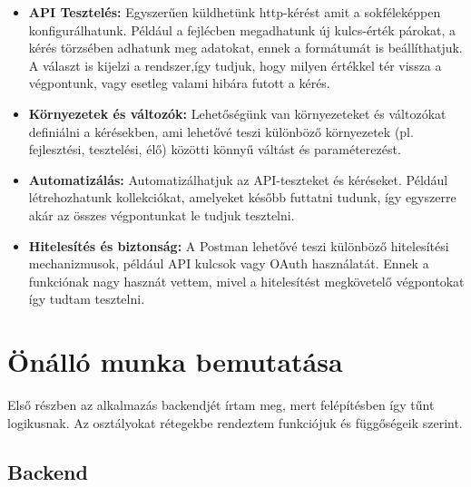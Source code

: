 \documentclass[a4paper,twoside]{article}
\begin{document}
\begin{itemize}
	\item \textbf{API Tesztelés:} Egyszerűen küldhetünk http-kérést amit a sokféleképpen konfigurálhatunk. Például a fejlécben megadhatunk új kulcs-érték párokat, a kérés törzsében adhatunk meg adatokat, ennek a formátumát is beállíthatjuk. A választ is kijelzi a rendszer,így tudjuk, hogy milyen értékkel tér vissza a végpontunk, vagy esetleg valami hibára futott a kérés. 
	\item \textbf{Környezetek és változók:} Lehetőségünk van környezeteket és változókat definiálni a kérésekben, ami lehetővé teszi különböző környezetek (pl. fejlesztési, tesztelési, élő) közötti könnyű váltást és paraméterezést.
	\item \textbf{Automatizálás:} Automatizálhatjuk az API-teszteket és kéréseket. Például létrehozhatunk kollekciókat, amelyeket később futtatni tudunk, így egyszerre akár az összes végpontunkat le tudjuk tesztelni. 
	\item \textbf{Hitelesítés és biztonság:} A Postman lehetővé teszi különböző hitelesítési mechanizmusok, például API kulcsok vagy OAuth használatát. Ennek a funkciónak nagy hasznát vettem, mivel a hitelesítést megkövetelő végpontokat így tudtam tesztelni. 
\end{itemize}




\newpage



\section{Önálló munka bemutatása}
Első részben az alkalmazás backendjét írtam meg, mert felépítésben így tűnt
logikusnak. Az osztályokat rétegekbe rendeztem funkciójuk és függőségeik szerint.
\subsection{Backend}
\end{document}
